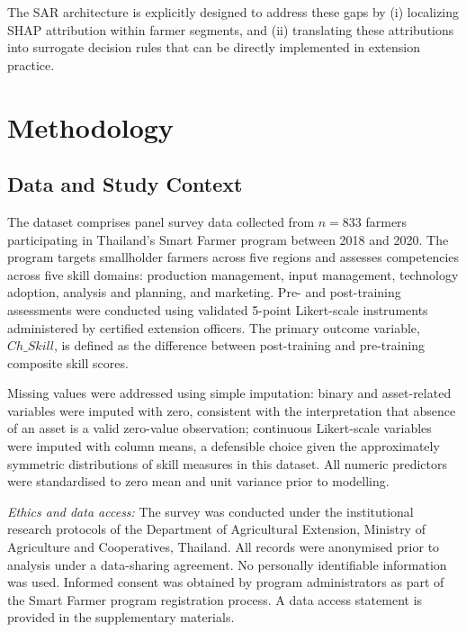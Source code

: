 \documentclass[3p,twocolumn,authoryear]{elsarticle}
\begin{document}
The SAR architecture is explicitly designed to address these gaps by
(i) localizing SHAP attribution within farmer segments, and
(ii) translating these attributions into surrogate decision rules that
can be directly implemented in extension practice.


\section{Methodology}

\subsection{Data and Study Context}

The dataset comprises panel survey data collected from $n = 833$ farmers
participating in Thailand's Smart Farmer program between 2018 and 2020.
The program targets smallholder farmers across five regions and assesses
competencies across five skill domains: production management, input
management, technology adoption, analysis and planning, and marketing.
Pre- and post-training assessments were conducted using validated
5-point Likert-scale instruments administered by certified extension
officers.
The primary outcome variable, $Ch\_Skill$, is defined as the
difference between post-training and pre-training composite skill scores.

Missing values were addressed using simple imputation: binary and
asset-related variables were imputed with zero, consistent with the
interpretation that absence of an asset is a valid zero-value
observation; continuous Likert-scale variables were imputed with column
means, a defensible choice given the approximately symmetric
distributions of skill measures in this dataset.
All numeric predictors were standardised to zero mean and unit variance
prior to modelling.

\textit{Ethics and data access:} The survey was conducted under the
institutional research protocols of the Department of Agricultural
Extension, Ministry of Agriculture and Cooperatives, Thailand.
All records were anonymised prior to analysis under a data-sharing
agreement.
No personally identifiable information was used.
Informed consent was obtained by program administrators as part of the
Smart Farmer program registration process.
A data access statement is provided in the supplementary materials.
\end{document}
